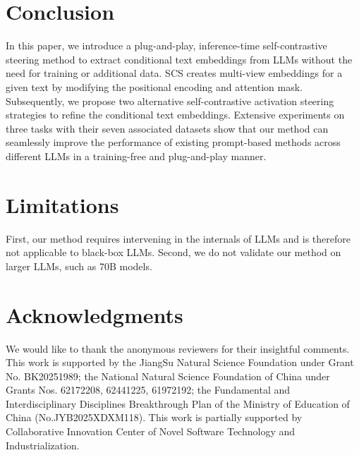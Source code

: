 \documentclass[11pt]{article}
\begin{document}
\section{Conclusion}
In this paper, we introduce a plug-and-play, inference-time self-contrastive steering method to extract conditional text embeddings from LLMs without the need for training or additional data.
SCS creates multi-view embeddings for a given text by modifying the positional encoding and attention mask.
Subsequently, we propose two alternative self-contrastive activation steering strategies to refine the conditional text embeddings.
Extensive experiments on three tasks with their seven associated datasets show that our method can seamlessly improve the performance of existing prompt-based methods across different LLMs in a training-free and plug-and-play manner.


\section*{Limitations}
First, our method requires intervening in the internals of LLMs and is therefore not applicable to black-box LLMs.
Second, we do not validate our method on larger LLMs, such as 70B models.



\section*{Acknowledgments}
We would like to thank the anonymous reviewers for their insightful comments.
This work is supported by the JiangSu Natural Science Foundation under Grant No. BK20251989; the National Natural Science Foundation of China under Grants Nos. 62172208, 62441225, 61972192; the Fundamental and Interdisciplinary Disciplines Breakthrough Plan of the Ministry of Education of China (No.JYB2025XDXM118).
This work is partially supported by Collaborative Innovation Center of Novel Software Technology and Industrialization.


%


\appendix
\end{document}

